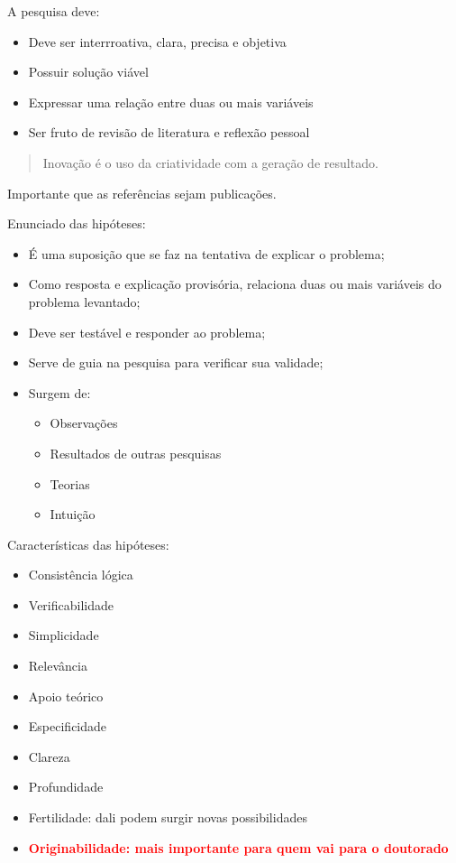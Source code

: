         A pesquisa deve:
        \begin{itemize}
            \item Deve ser interrroativa, clara, precisa e objetiva
            \item Possuir solução viável
            \item Expressar uma relação entre duas ou mais variáveis
            \item Ser fruto de revisão de literatura e reflexão pessoal
        \end{itemize}

        \begin{quotation}
            Inovação é o uso da criatividade com a geração de resultado.
        \end{quotation}

        Importante que as referências sejam publicações.

        Enunciado das hipóteses:
        \begin{itemize}
            \item É uma suposição que se faz na tentativa de explicar o problema;
            \item Como resposta e explicação provisória, relaciona duas ou mais variáveis do problema levantado;
            \item Deve ser testável e responder ao problema;
            \item Serve de guia na pesquisa para verificar sua validade;
            \item Surgem de:
            \begin{itemize}
                \item Observações
                \item Resultados de outras pesquisas
                \item Teorias
                \item Intuição
            \end{itemize}
        \end{itemize}

        Características das hipóteses:
        \begin{itemize}
            \item Consistência lógica
            \item Verificabilidade
            \item Simplicidade
            \item Relevância
            \item Apoio teórico
            \item Especificidade
            \item Clareza
            \item Profundidade
            \item Fertilidade: dali podem surgir novas possibilidades
            \item \textcolor{red}{\textbf{Originabilidade: mais importante para quem vai para o doutorado}}
        \end{itemize}

